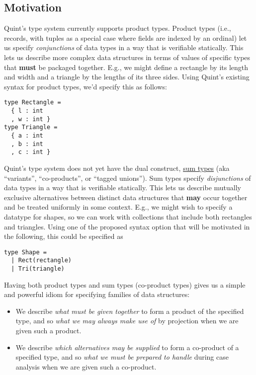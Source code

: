 \documentclass[11pt]{article}
\begin{document}
\subsection{Motivation}
\label{sec:org2103e46}
Quint's type system currently supports product types. Product types
(i.e., records, with tuples as a special case where fields are indexed
by an ordinal) let us specify \emph{conjunctions} of data types in a way that
is verifiable statically. This lets us describe more complex data
structures in terms of values of specific types that \textbf{must} be packaged
together. E.g., we might define a rectangle by its length and width and
a triangle by the lengths of its three sides. Using Quint's existing
syntax for product types, we'd specify this as follows:

\begin{verbatim}
type Rectangle = 
  { l : int
  , w : int }
type Triangle = 
  { a : int
  , b : int
  , c : int }
\end{verbatim}

Quint's type system does not yet have the dual construct,
\href{https://en.wikipedia.org/wiki/Tagged\_union}{sum types} (aka
``variants'', ``co-products'', or ``tagged unions''). Sum types specify
\emph{disjunctions} of data types in a way that is verifiable statically.
This lets us describe mutually exclusive alternatives between distinct
data structures that \textbf{may} occur together and be treated uniformly in
some context. E.g., we might wish to specify a datatype for shapes, so
we can work with collections that include both rectangles and triangles.
Using one of the proposed syntax option that will be motivated in the
following, this could be specified as

\begin{verbatim}
type Shape =
  | Rect(rectangle)
  | Tri(triangle)
\end{verbatim}

Having both product types and sum types (co-product types) gives us a
simple and powerful idiom for specifying families of data structures:

\begin{itemize}
\item We describe \emph{what must be given together} to form a product of the
specified type, and so \emph{what we may always make use of} by projection
when we are given such a product.
\item We describe \emph{which alternatives may be supplied} to form a co-product
of a specified type, and so \emph{what we must be prepared to handle}
during case analysis when we are given such a co-product.
\end{itemize}
\end{document}
